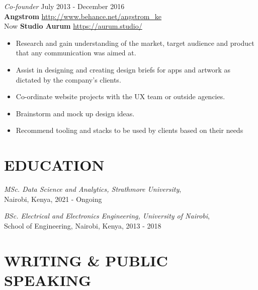 \documentclass[margin, line]{res} %
\begin{document}
    {\sl Co-founder} \hfill July 2013 - December 2016\\
    \textbf{Angstrom} \hfill \url{http://www.behance.net/angstrom_ke}\\
    Now \textbf{Studio Aurum} \hfill \url{https://aurum.studio/}
    \begin{itemize} \itemsep -2pt %
    \item Research and gain understanding of the market, target
      audience and product that any communication was aimed at.
    \item Assist in designing and creating design briefs for apps and
      artwork as dictated by the company's clients.
    \item Co-ordinate website projects with the UX team or outside
      agencies.
    \item Brainstorm and mock up design ideas.
    \item Recommend tooling and stacks to be used by clients based on
      their needs
    \end{itemize}

    \section{EDUCATION}

    {\sl MSc. Data Science and Analytics, Strathmore
      University},\\ Nairobi, Kenya, 2021 - Ongoing

    {\sl BSc. Electrical and Electronics Engineering, University of
      Nairobi},\\ School of Engineering, Nairobi, Kenya, 2013 - 2018


    \section{WRITING \& PUBLIC SPEAKING}
\end{document}
